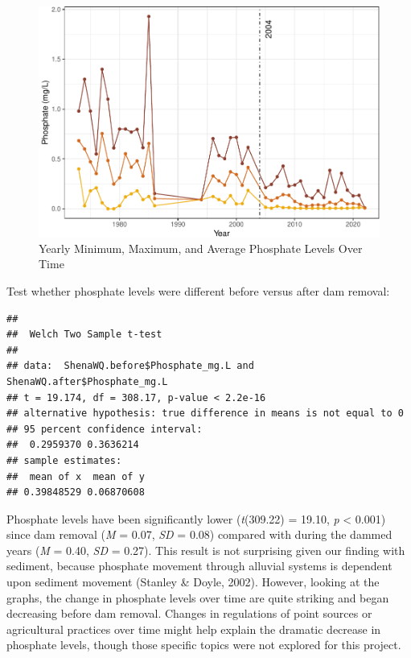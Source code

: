 \documentclass[
  12pt,
]{article}
\begin{document}
\begin{figure}
\centering
\includegraphics{Project_Script_files/figure-latex/Phosphate_Analysis3-1.pdf}
\caption{Yearly Minimum, Maximum, and Average Phosphate Levels Over
Time}
\end{figure}

Test whether phosphate levels were different before versus after dam
removal:

\begin{verbatim}
## 
##  Welch Two Sample t-test
## 
## data:  ShenaWQ.before$Phosphate_mg.L and ShenaWQ.after$Phosphate_mg.L
## t = 19.174, df = 308.17, p-value < 2.2e-16
## alternative hypothesis: true difference in means is not equal to 0
## 95 percent confidence interval:
##  0.2959370 0.3636214
## sample estimates:
##  mean of x  mean of y 
## 0.39848529 0.06870608
\end{verbatim}

Phosphate levels have been significantly lower (\emph{t}(309.22) =
19.10, \emph{p} \textless{} 0.001) since dam removal (\emph{M} = 0.07,
\emph{SD} = 0.08) compared with during the dammed years (\emph{M} =
0.40, \emph{SD} = 0.27). This result is not surprising given our finding
with sediment, because phosphate movement through alluvial systems is
dependent upon sediment movement (Stanley \& Doyle, 2002). However,
looking at the graphs, the change in phosphate levels over time are
quite striking and began decreasing before dam removal. Changes in
regulations of point sources or agricultural practices over time might
help explain the dramatic decrease in phosphate levels, though those
specific topics were not explored for this project.

\newpage
\end{document}
